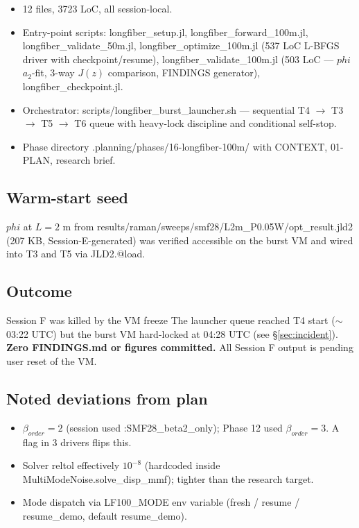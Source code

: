 \documentclass[11pt,letterpaper]{article}
\def\varphi{phi}%
\def\mathrm#1{#1}%
\def\texttt#1{#1}%
\begin{document}
\begin{itemize}[leftmargin=*]
  \item 12 files, 3723 LoC, all session-local.
  \item Entry-point scripts: \texttt{longfiber\_setup.jl}, \texttt{longfiber\_forward\_100m.jl}, \texttt{longfiber\_validate\_50m.jl}, \texttt{longfiber\_optimize\_100m.jl} (537 LoC L-BFGS driver with checkpoint/resume), \texttt{longfiber\_validate\_100m.jl} (503 LoC --- $\varphi$ $a_2$-fit, 3-way $J(z)$ comparison, FINDINGS generator), \texttt{longfiber\_checkpoint.jl}.
  \item Orchestrator: \texttt{scripts/longfiber\_burst\_launcher.sh} --- sequential T4 $\to$ T3 $\to$ T5 $\to$ T6 queue with heavy-lock discipline and conditional self-stop.
  \item Phase directory \texttt{.planning/phases/16-longfiber-100m/} with CONTEXT, 01-PLAN, research brief.
\end{itemize}

\subsection{Warm-start seed}

$\varphi$ at $L = 2$ m from \texttt{results/raman/sweeps/smf28/L2m\_P0.05W/opt\_result.jld2} (207 KB, Session-E-generated) was verified accessible on the burst VM and wired into T3 and T5 via \texttt{JLD2.@load}.

\subsection{Outcome}

\begin{blocker}{Session F was killed by the VM freeze}
The launcher queue reached T4 start ($\sim$03:22 UTC) but the burst VM hard-locked at 04:28 UTC (see \S\ref{sec:incident}). \textbf{Zero FINDINGS.md or figures committed.} All Session F output is pending user reset of the VM.
\end{blocker}

\subsection{Noted deviations from plan}

\begin{itemize}[leftmargin=*]
  \item $\beta_{\mathrm{order}} = 2$ (session used \texttt{:SMF28\_beta2\_only}); Phase 12 used $\beta_{\mathrm{order}} = 3$. A flag in 3 drivers flips this.
  \item Solver \texttt{reltol} effectively $10^{-8}$ (hardcoded inside \texttt{MultiModeNoise.solve\_disp\_mmf}); tighter than the research target.
  \item Mode dispatch via \texttt{LF100\_MODE} env variable (\texttt{fresh} / \texttt{resume} / \texttt{resume\_demo}, default \texttt{resume\_demo}).
\end{itemize}
\end{document}
